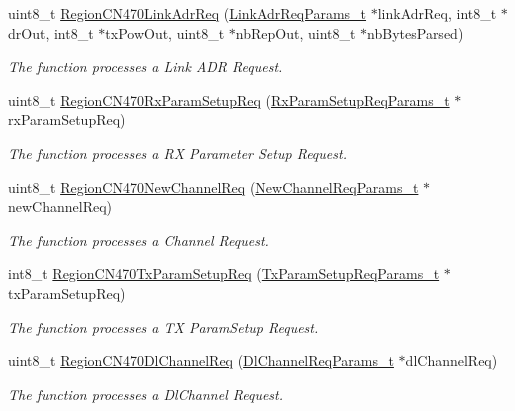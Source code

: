 \begin{DoxyCompactItemize}
uint8\+\_\+t \hyperlink{group__REGIONCN470_ga8390f178b68e708cd9741caba00cb05d}{Region\+C\+N470\+Link\+Adr\+Req} (\hyperlink{group__REGION_gad4af503e8d4de1846129e26a799a1e8e}{Link\+Adr\+Req\+Params\+\_\+t} $\ast$link\+Adr\+Req, int8\+\_\+t $\ast$dr\+Out, int8\+\_\+t $\ast$tx\+Pow\+Out, uint8\+\_\+t $\ast$nb\+Rep\+Out, uint8\+\_\+t $\ast$nb\+Bytes\+Parsed)
\begin{DoxyCompactList}\small\item\em The function processes a Link A\+DR Request. \end{DoxyCompactList}\item 
uint8\+\_\+t \hyperlink{group__REGIONCN470_gae6be53827b6148fa40a6c1a3f6a8058b}{Region\+C\+N470\+Rx\+Param\+Setup\+Req} (\hyperlink{group__REGION_ga7165f282c670c728c36d534df2285157}{Rx\+Param\+Setup\+Req\+Params\+\_\+t} $\ast$rx\+Param\+Setup\+Req)
\begin{DoxyCompactList}\small\item\em The function processes a RX Parameter Setup Request. \end{DoxyCompactList}\item 
uint8\+\_\+t \hyperlink{group__REGIONCN470_ga3db01af8efb6f0c07db00b78dcb2ebfe}{Region\+C\+N470\+New\+Channel\+Req} (\hyperlink{group__REGION_gae2abcdb6dbb843c9faf5fd3009eca9d6}{New\+Channel\+Req\+Params\+\_\+t} $\ast$new\+Channel\+Req)
\begin{DoxyCompactList}\small\item\em The function processes a Channel Request. \end{DoxyCompactList}\item 
int8\+\_\+t \hyperlink{group__REGIONCN470_ga26c513769fa09c8bd92f15805162860b}{Region\+C\+N470\+Tx\+Param\+Setup\+Req} (\hyperlink{group__REGION_ga26836ef2996e70410e42ef471073f855}{Tx\+Param\+Setup\+Req\+Params\+\_\+t} $\ast$tx\+Param\+Setup\+Req)
\begin{DoxyCompactList}\small\item\em The function processes a TX Param\+Setup Request. \end{DoxyCompactList}\item 
uint8\+\_\+t \hyperlink{group__REGIONCN470_ga2fb7a7dcde7482f3a0da9028090c9c7f}{Region\+C\+N470\+Dl\+Channel\+Req} (\hyperlink{group__REGION_gae0d608ff1f8ea0a430e4f9a4c38ec7f3}{Dl\+Channel\+Req\+Params\+\_\+t} $\ast$dl\+Channel\+Req)
\begin{DoxyCompactList}\small\item\em The function processes a Dl\+Channel Request. \end{DoxyCompactList}\item 

\end{DoxyCompactItemize}
